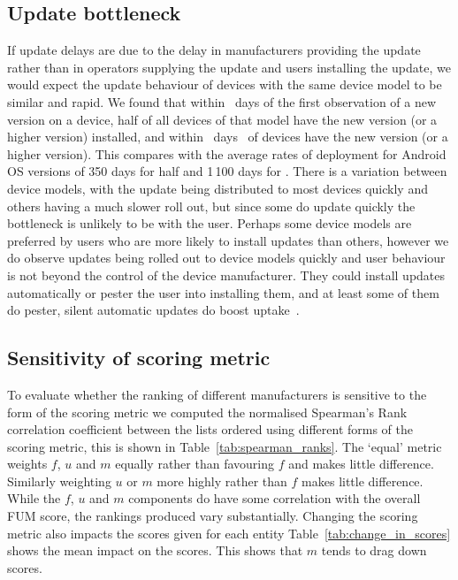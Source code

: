 \subsection{Update bottleneck}
If update delays are due to the delay in manufacturers providing the update rather than in operators supplying the update and users installing the update, we would expect the update behaviour of devices with the same device model to be similar and rapid.
We found that within \daModelHalfDeployment\ days of the first observation of a new version on a device, half of all devices of that model have the new version (or a higher version) installed, and within \daModelFullDeployment\ days \daFullDeployedAt\ of devices have the new version (or a higher version).
This compares with the average rates of deployment for Android OS versions of 350 days for half and 1\,100 days for \daFullDeployedAt.
There is a variation between device models, with the update being distributed to most devices quickly and others having a much slower roll out, but since some do update quickly the bottleneck is unlikely to be with the user.
Perhaps some device models are preferred by users who are more likely to install updates than others, however we do observe updates being rolled out to device models quickly and user behaviour is not beyond the control of the device manufacturer.
They could install updates automatically or pester the user into installing them, and at least some of them do pester, silent automatic updates do boost uptake~\cite{Duebendorfer2009}.


\subsection{Sensitivity of scoring metric}
\daTabSpearmanRanks
\daTabChangeInScores
To evaluate whether the ranking of different manufacturers is sensitive to the form of the scoring metric we computed the normalised Spearman's Rank correlation coefficient between the lists ordered using different forms of the scoring metric, this is shown in Table~\ref{tab:spearman_ranks}.
The `equal' metric weights $f$, $u$ and $m$ equally rather than favouring $f$ and makes little difference.
Similarly weighting $u$ or $m$ more highly rather than $f$ makes little difference.
While the $f$, $u$ and $m$ components do have some correlation with the overall FUM score, the rankings produced vary substantially.
Changing the scoring metric also impacts the scores given for each entity Table~\ref{tab:change_in_scores} shows the mean impact on the scores.
This shows that $m$ tends to drag down scores.


